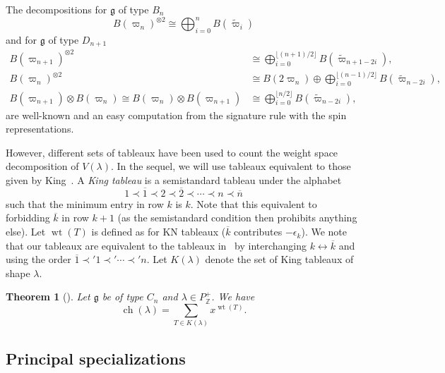 \documentclass[11pt, leqno]{amsart}
\theoremstyle{plain}
\newtheorem{theorem}{Theorem}[section]
\theoremstyle{definition}
\numberwithin{equation}{section}
\newcommand{\g}{\mathfrak{g}}
\newcommand{\iso}{\cong} %
\newcommand{\fw}{\varpi} %
\newcommand{\tfw}{\widetilde{\fw}} %
\newcommand{\Z}{\mathbb{Z}}
\newcommand{\wt}{\operatorname{wt}} %
\newcommand{\ch}{\operatorname{ch}} %
\newcommand{\otwo}{\overline{2}}
\newcommand{\one}{\overline{1}}
\newcommand{\on}{\overline{n}}
\newcommand{\ok}{\overline{k}}
\newcommand{\defn}[1]{{\color{darkred}\emph{#1}}} %
\begin{document}
The decompositions for $\g$ of type $B_n$
\begin{equation}
\label{eq:2tens_B}
B(\fw_n)^{\otimes 2} \iso \bigoplus_{i=0}^{n} B(\tfw_i)
\end{equation}
and for $\g$ of type $D_{n+1}$
\begin{subequations}
\label{eq:2tens}
\begin{align}
\label{eq:2tens_Dpp}
B(\fw_{n+1})^{\otimes 2} & \iso \bigoplus_{i=0}^{\lfloor (n+1)/2 \rfloor} B(\tfw_{n+1-2i}),
\\ \label{eq:2tens_Dmm}
B(\fw_n)^{\otimes 2} & \iso B(2\fw_n) \oplus \bigoplus_{i=0}^{\lfloor (n-1)/2 \rfloor} B(\tfw_{n-2i}),
\\ \label{eq:2tens_Dpm}
B(\fw_{n+1}) \otimes B(\fw_{n}) \iso B(\fw_{n}) \otimes B(\fw_{n+1}) & \iso \bigoplus_{i=0}^{\lfloor n/2 \rfloor} B(\tfw_{n-2i}),
\end{align}
\end{subequations}
are well-known and an easy computation from the signature rule with the spin representations.

However, different sets of tableaux have been used to count the weight space decomposition of $V(\lambda)$.
In the sequel, we will use tableaux equivalent to those given by King~\cite{King76}. A \defn{King tableau} is a semistandard tableau under the alphabet
\[
1 \prec \one \prec 2 \prec \otwo \prec \cdots \prec n \prec \on
\]
such that the minimum entry in row $k$ is $k$. Note that this equivalent to forbidding $\ok$ in row $k+1$ (as the semistandard condition then prohibits anything else).
Let $\wt(T)$ is defined as for KN tableaux ($\ok$ contributes $-\epsilon_k$).
We note that our tableaux are equivalent to the tableaux in~\cite{King76} by interchanging $k \leftrightarrow \ok$ and using the order $\one \prec' 1 \prec' \cdots \prec' n$. Let $K(\lambda)$ denote the set of King tableaux of shape $\lambda$.

\begin{theorem}[{\cite{King76}}]
\label{thm:king_decomposition}
Let $\g$ be of type $C_n$ and $\lambda \in P_{\Z}^+$. We have
\[
\ch(\lambda) = \sum_{T \in K(\lambda)} x^{\wt(T)}.
\]
\end{theorem}


\subsection{Principal specializations}
\end{document}
